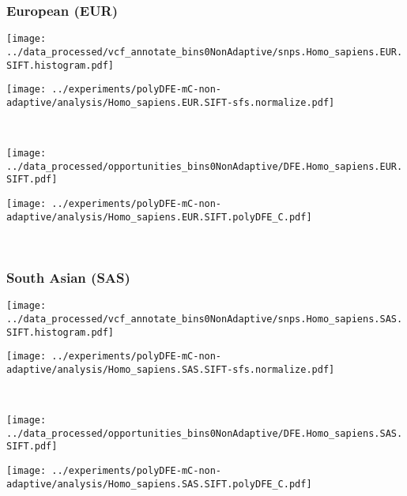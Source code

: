 \subsubsection{European (EUR)}

\begin{minipage}{0.49\linewidth}
    \texttt{[image: ../data\_processed/vcf\_annotate\_bins0NonAdaptive/snps.Homo\_sapiens.EUR.SIFT.histogram.pdf]}
\end{minipage}
\begin{minipage}{0.49\linewidth}
    \texttt{[image: ../experiments/polyDFE-mC-non-adaptive/analysis/Homo\_sapiens.EUR.SIFT-sfs.normalize.pdf]}
\end{minipage}
\\
\begin{minipage}{0.49\linewidth}
    \texttt{[image: ../data\_processed/opportunities\_bins0NonAdaptive/DFE.Homo\_sapiens.EUR.SIFT.pdf]}
\end{minipage}
\begin{minipage}{0.49\linewidth}
    \texttt{[image: ../experiments/polyDFE-mC-non-adaptive/analysis/Homo\_sapiens.EUR.SIFT.polyDFE\_C.pdf]}
\end{minipage}
\\

\subsubsection{South Asian (SAS)}

\begin{minipage}{0.49\linewidth}
    \texttt{[image: ../data\_processed/vcf\_annotate\_bins0NonAdaptive/snps.Homo\_sapiens.SAS.SIFT.histogram.pdf]}
\end{minipage}
\begin{minipage}{0.49\linewidth}
    \texttt{[image: ../experiments/polyDFE-mC-non-adaptive/analysis/Homo\_sapiens.SAS.SIFT-sfs.normalize.pdf]}
\end{minipage}
\\
\begin{minipage}{0.49\linewidth}
    \texttt{[image: ../data\_processed/opportunities\_bins0NonAdaptive/DFE.Homo\_sapiens.SAS.SIFT.pdf]}
\end{minipage}
\begin{minipage}{0.49\linewidth}
    \texttt{[image: ../experiments/polyDFE-mC-non-adaptive/analysis/Homo\_sapiens.SAS.SIFT.polyDFE\_C.pdf]}
\end{minipage}
\\

